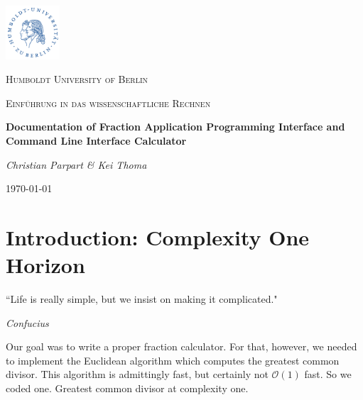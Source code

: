 \documentclass[refman]{scrartcl}
\begin{document}

\begin{titlepage}
	\centering
	\includegraphics[width=0.15\textwidth]{graphics/huberlin_logo}\par\vspace{1cm}
	{\scshape\LARGE Humboldt University of Berlin \par}
	\vspace{1cm}
	{\scshape\Large Einf{\"u}hrung in das wissenschaftliche Rechnen \par}
	\vspace{1.5cm}
	{\huge\bfseries Documentation of Fraction Application Programming Interface and Command Line Interface Calculator\par}
	\vspace{2cm}
	{\Large\itshape Christian Parpart \& Kei Thoma \par}
	\vfill

	\vfill

	{\large \today\par}
\end{titlepage}

\tableofcontents
\newpage


\section{Introduction: Complexity One Horizon}
\vspace{4cm}\epigraph{“Life is really simple, but we insist on making it complicated."}{\textit{Confucius}}

\noindent Our goal was to write a proper fraction calculator. For that, however, we needed to implement the Euclidean algorithm which computes the greatest common divisor. This algorithm is admittingly fast, but certainly not \(\mathcal{O}(1)\) fast. So we coded one. Greatest common divisor at complexity one.
\end{document}
